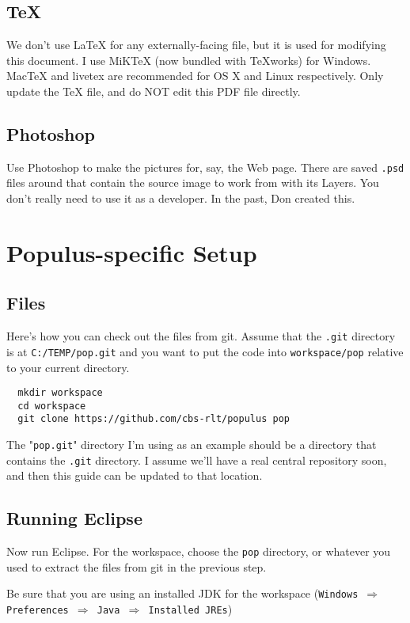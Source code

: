 \documentclass[12pt]{article}
\begin{document}
\subsection{TeX}
We don't use LaTeX for any externally-facing file, but it is used for modifying this document.  I use MiKTeX (now bundled with TeXworks) for Windows.  MacTeX and livetex are recommended for OS X and Linux respectively.  Only update the TeX file, and do NOT edit this PDF file directly.

\subsection{Photoshop}
Use Photoshop to make the pictures for, say, the Web page.  There are saved \texttt{.psd} files around that contain the source image to work from with its Layers.  You don't really need to use it as a developer.  In the past, Don created this.

\section{Populus-specific Setup}
\subsection{Files}

Here's how you can check out the files from git.  Assume that the \texttt{.git} directory is at \texttt{C:/TEMP/pop.git} and you want to put the code into \texttt{workspace/pop} relative to your current directory.

\begin{verbatim}
  mkdir workspace
  cd workspace
  git clone https://github.com/cbs-rlt/populus pop
\end{verbatim}

The "\texttt{pop.git}" directory I'm using as an example should be a directory that contains the \texttt{.git} directory.  I assume we'll have a real central repository soon, and then this guide can be updated to that location.

\subsection{Running Eclipse}
Now run Eclipse.  For the workspace, choose the \texttt{pop} directory, or whatever you used to extract the files from git in the previous step.

Be sure that you are using an installed JDK for the workspace (\texttt{Windows $\Rightarrow$ Preferences $\Rightarrow$ Java $\Rightarrow$ Installed JREs})
\end{document}
